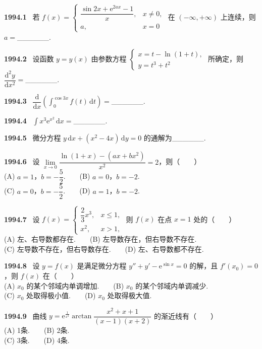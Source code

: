 \documentclass[UTF8,12pt]{ctexart}
\newcommand{\qn}[1]{\textbf{\large #1}\ }
\begin{document}
\qn{1994.1}
若 $f(x)=\begin{cases}\dfrac{\sin 2x+\mathrm{e}^{2ax}-1}{x}, & x\neq 0,\\ a, & x=0\end{cases}$ 在 $(-\infty,+\infty)$ 上连续，则 $a=$______.

\vfill
\newpage
\qn{1994.2}
设函数 $y=y(x)$ 由参数方程 $\begin{cases}x=t-\ln(1+t),\\ y=t^3+t^2\end{cases}$ 所确定，则 $\dfrac{\mathrm{d}^2y}{\mathrm{d}x^2}=$______.

\vfill
\newpage
\qn{1994.3}
$\dfrac{\mathrm{d}}{\mathrm{d}x}\left(\int_0^{\cos 3x}f(t)\,\mathrm{d}t\right)=$______.

\vfill
\newpage
\qn{1994.4}
$\int x^3\mathrm{e}^{x^2}\,\mathrm{d}x=$______.

\vfill
\newpage
\qn{1994.5}
微分方程 $y\,\mathrm{d}x+(x^2-4x)\,\mathrm{d}y=0$ 的通解为______.

\vfill
\newpage
\qn{1994.6}
设 $\lim\limits_{x\to0}\dfrac{\ln(1+x)-(ax+bx^2)}{x^2}=2$，则（　　）
\\
\noindent (A) $a=1$，$b=-\dfrac{5}{2}$.　　(B) $a=0$，$b=-2$.
\\
\noindent (C) $a=0$，$b=-\dfrac{5}{2}$.　　(D) $a=1$，$b=-2$.

\vfill
\newpage
\qn{1994.7}
设 $f(x)=\begin{cases}\dfrac{2}{3}x^3, & x\leqslant 1,\\ x^2, & x>1,\end{cases}$ 则 $f(x)$ 在点 $x=1$ 处的（　　）
\\
\noindent (A) 左、右导数都存在.　　(B) 左导数存在，但右导数不存在.
\\
\noindent (C) 左导数不存在，但右导数存在.　　(D) 左、右导数都不存在.

\vfill
\newpage
\qn{1994.8}
设 $y=f(x)$ 是满足微分方程 $y''+y'-\mathrm{e}^{\sin x}=0$ 的解，且 $f'(x_0)=0$，则 $f(x)$ 在（　　）
\\
\noindent (A) $x_0$ 的某个邻域内单调增加.　　(B) $x_0$ 的某个邻域内单调减少.
\\
\noindent (C) $x_0$ 处取得极小值.　　(D) $x_0$ 处取得极大值.

\vfill
\newpage
\qn{1994.9}
曲线 $y=\mathrm{e}^{\frac{1}{x^2}}\arctan\dfrac{x^2+x+1}{(x-1)(x+2)}$ 的渐近线有（　　）
\\
\noindent (A) 1条.　　(B) 2条.
\\
\noindent (C) 3条.　　(D) 4条.
\end{document}
